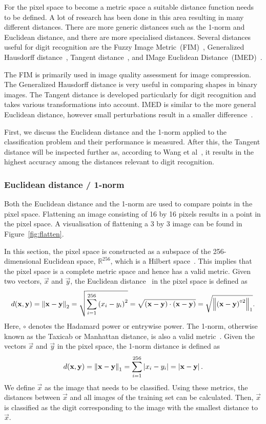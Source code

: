 For the pixel space to become a metric space a suitable distance function needs to be defined.
A lot of research has been done in this area resulting in many different distances.
There are more generic distances such as the 1-norm and Euclidean distance, and there are more specialised distances.
Several distances useful for digit recognition are the Fuzzy Image Metric~(FIM)~\cite{JunliLi2002}, Generalized Hausdorff distance~\cite{Huttenlocher2003}, Tangent distance~\cite{Simard1992}, and IMage Euclidean Distance~(IMED)~\cite{LiweiWang2005}.

The FIM is primarily used in image quality assessment for image compression. The Generalized Hausdorff distance is very useful in comparing shapes in binary images.
The Tangent distance is developed particularly for digit recognition and takes various transformations into account.
IMED is similar to the more general Euclidean distance, however small perturbations result in a smaller difference~\cite{LiweiWang2005}.

First, we discuss the Euclidean distance and the 1-norm applied to the classification problem and their performance is measured.
After this, the Tangent distance will be inspected further as, according to Wang et al~\cite{LiweiWang2005}, it results in the highest accuracy among the distances relevant to digit recognition.

\subsubsection{Euclidean distance / 1-norm}
Both the Euclidean distance and the 1-norm are used to compare points in the pixel space.
Flattening an image consisting of 16 by 16 pixels results in a point in the pixel space. A visualisation of flattening a 3 by 3 image can be found in Figure~\ref{fig:flatten}.

In this section, the pixel space is constructed as a subspace of the 256-dimensional Euclidean space, \(\mathbb{R}^{256}\), which is a Hilbert space~\cite{Bramwell2007}.
This implies that the pixel space is a complete metric space and hence has a valid metric.
Given two vectors, \(\vec{x}\) and \(\vec{y}\), the Euclidean distance~\cite{Bramwell2007} in the pixel space is defined as
\[
    d(\mathbf{x}, \mathbf{y}) = \left\lVert\mathbf{x} - \mathbf{y}\right\rVert_2 = \sqrt{\sum_{i = 1}^{256} {(x_i - y_i)}^2} = \sqrt{(\mathbf{x} - \mathbf{y})\cdot (\mathbf{x} - \mathbf{y})} = \sqrt{\left\lVert{(\mathbf{x} - \mathbf{y})}^{\circ 2}\right\rVert_1}.
\]
Here, \(\circ \) denotes the Hadamard power or entrywise power.
The 1-norm, otherwise known as the Taxicab or Manhattan distance, is also a valid metric~\cite{Black2019}.
Given the vectors \(\vec{x}\) and \(\vec{y}\) in the pixel space, the 1-norm distance is defined as
\[ d(\mathbf{x}, \mathbf{y}) = \left\lVert\mathbf{x} - \mathbf{y}\right\rVert_1 = \sum_{i = 1}^{256} \left|x_i - y_i\right| = \left|\mathbf{x}-\mathbf{y}\right|.\]
We define \(\vec{x}\) as the image that needs to be classified. Using these metrics, the distances between \(\vec{x}\) and all images of the training set can be calculated.
Then, \(\vec{x}\) is classified as the digit corresponding to the image with the smallest distance to \(\vec{x}\).

